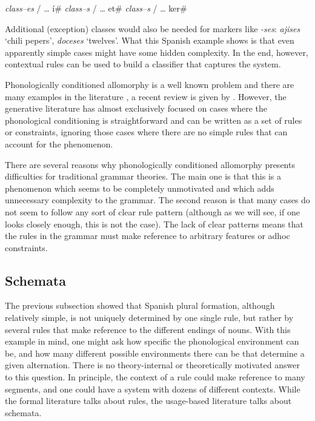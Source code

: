\begin{exe}
    \ex \begin{xlist}
        \ex \textit{class--es} / \dots{} í\#
        \ex \textit{class--s} / \dots{} et\#
        \ex \textit{class--s} / \dots{} ker\#
    \end{xlist}
\end{exe}

Additional (exception) classes would also be needed for markers like \textit{-ses}: \textit{aji\emph{ses}} `chili pepers', \textit{doce\emph{ses}} `twelves'. What this Spanish example shows is that even apparently simple cases might have some hidden complexity. In the end, however, contextual rules can be used to build a classifier that captures the system.

Phonologically conditioned allomorphy is a well known problem and there are many examples in the literature \autocites{Alber.2009, Anderson.2008, Baptista.2006, Booij.1998, Carstairs.1998, Malkiel.1988, Rubach.2001}, a recent review is given by \textcite{Nevins.2011a}. However, the generative literature has almost exclusively focused on cases where the phonological conditioning is straightforward and can be written as a set of rules or constraints, ignoring those cases where there are no simple rules that can account for the phenomenon.

There are several reasons why phonologically conditioned allomorphy presents difficulties for traditional grammar theories. The main one is that this is a phenomenon which seems to be completely unmotivated and which adds unnecessary complexity to the grammar. The second reason is that many cases do not seem to follow any sort of clear rule pattern (although as we will see, if one looks closely enough, this is not the case). The lack of clear patterns means that the rules in the grammar must make reference to arbitrary features or adhoc constraints.


\subsection{Schemata}


The previous subsection showed that Spanish plural formation, although relatively simple, is not uniquely determined by one single rule, but rather by several rules that make reference to the different endings of nouns. With this example in mind, one might ask how specific the phonological environment can be, and how many different possible environments there can be that determine a given alternation. There is no theory-internal or theoretically motivated answer to this question. In principle, the context of a rule could make reference to many segments, and one could have a system with dozens of different contexts. While the formal literature talks about rules, the usage-based literature talks about schemata.

